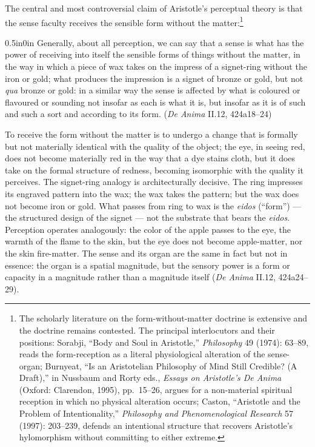 \documentclass{article}
\begin{document}
The central and most controversial claim of Aristotle's perceptual theory is that the sense faculty receives the sensible form without the matter:\footnote{The scholarly literature on the form-without-matter doctrine is extensive and the doctrine remains contested. The principal interlocutors and their positions: Sorabji, ``Body and Soul in Aristotle,'' \textit{Philosophy} 49 (1974): 63--89, reads the form-reception as a literal physiological alteration of the sense-organ; Burnyeat, ``Is an Aristotelian Philosophy of Mind Still Credible? (A Draft),'' in Nussbaum and Rorty eds., \textit{Essays on Aristotle's De Anima} (Oxford: Clarendon, 1995), pp.~15--26, argues for a non-material spiritual reception in which no physical alteration occurs; Caston, ``Aristotle and the Problem of Intentionality,'' \textit{Philosophy and Phenomenological Research} 57 (1997): 203--239, defends an intentional structure that recovers Aristotle's hylomorphism without committing to either extreme.}
\begin{adjustwidth}{0.5in}{0in}
Generally, about all perception, we can say that a sense is what has the power of receiving into itself the sensible forms of things without the matter, in the way in which a piece of wax takes on the impress of a signet-ring without the iron or gold; what produces the impression is a signet of bronze or gold, but not \textit{qua} bronze or gold: in a similar way the sense is affected by what is coloured or flavoured or sounding not insofar as each is what it is, but insofar as it is of such and such a sort and according to its form. (\textit{De Anima} II.12, 424a18--24)
\end{adjustwidth}
To receive the form without the matter is to undergo a change that is formally but not materially identical with the quality of the object; the eye, in seeing red, does not become materially red in the way that a dye stains cloth, but it does take on the formal structure of redness, becoming isomorphic with the quality it perceives. The signet-ring analogy is architecturally decisive. The ring impresses its engraved pattern into the wax; the wax takes the pattern; but the wax does not become iron or gold. What passes from ring to wax is the \textit{eidos} (``form'') --- the structured design of the signet --- not the substrate that bears the \textit{eidos}. Perception operates analogously: the color of the apple passes to the eye, the warmth of the flame to the skin, but the eye does not become apple-matter, nor the skin fire-matter. The sense and its organ are the same in fact but not in essence: the organ is a spatial magnitude, but the sensory power is a form or capacity in a magnitude rather than a magnitude itself (\textit{De Anima} II.12, 424a24--29).
\end{document}
